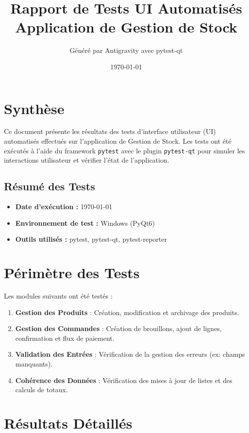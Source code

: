 \documentclass[a4paper,12pt]{article}
\title{
    \vspace{2cm}
    \textbf{\Huge Rapport de Tests UI Automatisés}\\[0.5cm]
    \Large Application de Gestion de Stock\\[2cm]
}
\author{Généré par Antigravity avec pytest-qt}
\date{\today}
\begin{document}
\maketitle
\thispagestyle{empty}
\newpage

\setcounter{page}{1}

\section{Synthèse}
Ce document présente les résultats des tests d'interface utilisateur (UI) automatisés effectués sur l'application de Gestion de Stock. Les tests ont été exécutés à l'aide du framework \texttt{pytest} avec le plugin \texttt{pytest-qt} pour simuler les interactions utilisateur et vérifier l'état de l'application.

\subsection{Résumé des Tests}
\begin{itemize}
    \item \textbf{Date d'exécution :} \today
    \item \textbf{Environnement de test :} Windows (PyQt6)
    \item \textbf{Outils utilisés :} pytest, pytest-qt, pytest-reporter
\end{itemize}

\section{Périmètre des Tests}
Les modules suivants ont été testés :
\begin{enumerate}
    \item \textbf{Gestion des Produits} : Création, modification et archivage des produits.
    \item \textbf{Gestion des Commandes} : Création de brouillons, ajout de lignes, confirmation et flux de paiement.
    \item \textbf{Validation des Entrées} : Vérification de la gestion des erreurs (ex: champs manquants).
    \item \textbf{Cohérence des Données} : Vérification des mises à jour de listes et des calculs de totaux.
\end{enumerate}

\section{Résultats Détaillés}
\end{document}
